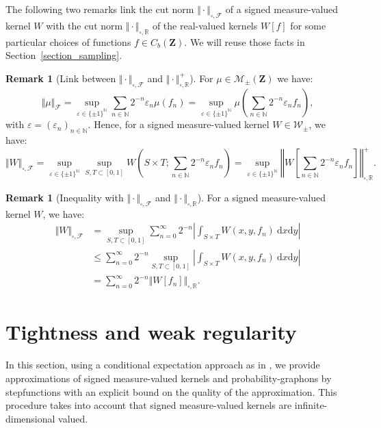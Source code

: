 \documentclass{amsart}
\theoremstyle{plain}
\theoremstyle{definition}
\newtheorem{remark}[Th]{Remark}
\newcommand{\Space}{\mathbf{Z}}
\newcommand{\signed}{\pm}
\newcommand{\SignedMeas}{\mathcal{M}_{\pm}(\Space)}
\newcommand{\CbFunct}{C_b(\Space)}
\newcommand{\Kernel}{\mathcal{W}_{\signed}}
\newcommand{\NcutR}[1]{\Vert#1\Vert_{\square,\R}}
\newcommand{\NcutRSymbol}{\Vert\cdot\Vert_{\square,\R}}
\newcommand{\NcutRpos}[1]{\Vert#1\Vert_{\square,\R}^+}
\newcommand{\NcutRposLarge}[1]{\left\Vert#1\right\Vert_{\square,\R}^+}
\newcommand{\NmeasF}[1]{\Vert#1\Vert_{\mathcal{F}}}
\newcommand{\NcutF}[1]{\Vert#1\Vert_{\square,\mathcal{F}}}
\newcommand{\NcutFSymbol}{\Vert\cdot\Vert_{\square,\mathcal{F}}}
\newcommand{\N}{\mathbb{N}}
\newcommand{\R}{\mathbb{R}}
\newcommand{\drv}{\mathrm{d}}
\newcommand{\eps}{\varepsilon}
\begin{document}
The following two remarks link the cut norm $\NcutFSymbol$
of a signed measure-valued kernel $W$
with the cut norm $\NcutRSymbol$
of the real-valued kernels $W[f]$
for some particular choices of functions $f\in\CbFunct$.
We will reuse those facts in Section~\ref{section_sampling}.


\begin{remark}[Link between $\NcutFSymbol$ and $\NcutRpos{\cdot}$]
	\label{rem:N_F_and_N_R_+} 
For $\mu\in\SignedMeas$ we have:
\begin{equation}\label{eq:def_norm_F_with_eps}
\NmeasF{\mu}
= \sup_{\eps \in \{ \pm 1\}^\N}
\sum_{n\in\N} 2^{-n} \eps_n \mu(f_n)
= \sup_{\eps \in \{ \pm 1\}^\N}
\mu \left( \sum_{n\in\N} 2^{-n} \eps_n f_n \right),
\end{equation}
with $\varepsilon=(\varepsilon_n)_{n\in\N}$. 
Hence, for a signed measure-valued kernel $W\in\Kernel$, we have:
\begin{equation}\label{eq:def_cut_norm_with_eps}
\NcutF{W} 
= \sup_{\eps \in \{ \pm 1\}^\N}  \sup_{S, T\subset [0,1]}
	W\left(S\times T; \sum_{n\in\N} 2^{-n} \eps_n f_n \right)
= \sup_{\eps \in \{ \pm 1\}^\N}	
		\NcutRposLarge{W \left[ \sum_{n\in\N} 2^{-n} \eps_n f_n \right]}.
\end{equation}
\end{remark}

\begin{remark}[Inequality with $\NcutFSymbol$ and $\NcutR{\cdot}$]
For a signed measure-valued kernel $W$, we have:
\begin{align}
\NcutF{W}
& = \sup_{S,T \subset [0,1]} \sum_{n=0}^\infty 2^{-n} \left| \int_{S\times T}  W(x,y,f_n) \ \drv x \drv y \right|
\nonumber \\
& \leq \sum_{n=0}^\infty 2^{-n} \sup_{S,T \subset [0,1]} \left| \int_{S\times T}  W(x,y,f_n) \ \drv x \drv y \right|
\nonumber \\
& = \sum_{n=0}^\infty 2^{-n} \NcutR{W[f_n]}	 
. \label{major_dist_graph}
\end{align}
\end{remark}





\section{Tightness and weak regularity}
\label{sec:tight-reg}

In  this  section,  using  a  conditional  expectation  approach  as  in
\cite[Chapter  9]{Lovasz}, we  provide approximations  of signed measure-valued
kernels and probability-graphons by stepfunctions  with an explicit bound on the  quality of the
approximation.   This procedure  takes into  account that  signed measure-valued
kernels are infinite-dimensional valued.
\end{document}
